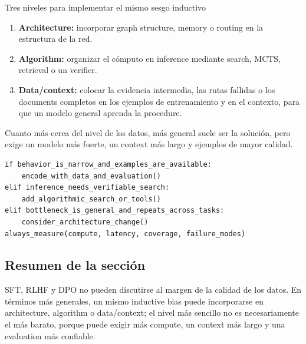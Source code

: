 \documentclass[a4paper]{article}
\begin{document}
\begin{importantbox}{Tres niveles para implementar el mismo sesgo inductivo}
\begin{enumerate}
  \item \textbf{Architecture:} incorporar graph structure, memory o routing en la estructura de la red.
  \item \textbf{Algorithm:} organizar el cómputo en inference mediante search, MCTS, retrieval o un verifier.
  \item \textbf{Data/context:} colocar la evidencia intermedia, las rutas fallidas o los documents completos en los ejemplos de entrenamiento y en el contexto, para que un modelo general aprenda la procedure.
\end{enumerate}
Cuanto más cerca del nivel de los datos, más general suele ser la solución, pero exige un modelo más fuerte, un context más largo y ejemplos de mayor calidad.
\end{importantbox}

\begin{lstlisting}[caption={Marco de decisión para elegir entre data, algorithm o architecture}]
if behavior_is_narrow_and_examples_are_available:
    encode_with_data_and_evaluation()
elif inference_needs_verifiable_search:
    add_algorithmic_search_or_tools()
elif bottleneck_is_general_and_repeats_across_tasks:
    consider_architecture_change()
always_measure(compute, latency, coverage, failure_modes)
\end{lstlisting}



\subsection{Resumen de la sección}

SFT, RLHF y DPO no pueden discutirse al margen de la calidad de los datos. En términos más generales, un mismo inductive bias puede incorporarse en architecture, algorithm o data/context; el nivel más sencillo no es necesariamente el más barato, porque puede exigir más compute, un context más largo y una evaluation más confiable.
\end{document}

